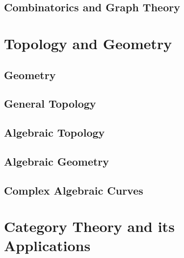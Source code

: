\documentclass[12pt]{report}
\begin{document}
\chapter{Combinatorics and Graph Theory}\label{cha:comb-graph-theory}


\part{Topology and Geometry}

\chapter{Geometry}\label{cha:geometry}

\chapter{General Topology}\label{cha:general-topology}

\chapter{Algebraic Topology}\label{cha:algebraic-topology}

\chapter{Algebraic Geometry}\label{cha:algebraic-geometry}

\chapter{Complex Algebraic Curves}\label{cha:compl-algebr-curv}





\part{Category Theory and its Applications}\label{part:category-theory-its}

\end{document}
